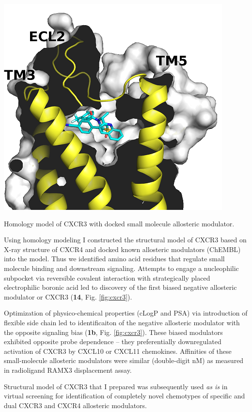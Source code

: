 \documentclass{tufte-handout}
\begin{document}
\begin{marginfigure}\label{fig:cxcrHM}
	\includegraphics{cxcr3hpp_small.png}
	\caption{Homology model of CXCR3 with docked small molecule allosteric modulator.}
\end{marginfigure}
 Using homology modeling 
I constructed the structural model of CXCR3 based on X-ray structure of CXCR4 and
docked known allosteric modulators (ChEMBL) into the model. Thus we identified amino acid 
residues that regulate small molecule binding and downstream signaling. Attempts to engage 
a nucleophilic subpocket via reversible covalent interaction with strategically placed electrophilic boronic acid led
to discovery of the first biased negative allosteric modulator or CXCR3 (\textbf{14}, Fig. \ref{fig:cxcr3}).\cite{Bernat2014} 

Optimization of physico-chemical properties (cLogP and PSA) via introduction of flexible side
chain led to identificaiton of the negative allosteric modulator 
with the opposite signaling bias (\textbf{1b}, Fig. \ref{fig:cxcr3}). 
These biased modulators exhibited opposite probe dependence -- they preferentially
downregulated activation of CXCR3 by CXCL10 or CXCL11 chemokines.\cite{Bernat2015a} 
Affinities of these small-molecule allosteric modulators were similar (double-digit nM) as 
measured in radioligand RAMX3 displacement assay.\cite{Bernat2012}


Structural model of CXCR3 that I prepared was subsequently used \textit{as is} in virtual screening for identification
of completely novel chemotypes of specific and dual CXCR3 and CXCR4 allosteric modulators.\cite{Schmidt2015}
\end{document}
